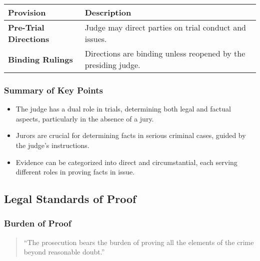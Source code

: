\begin{longtable}[]{@{}
  >{\raggedright\arraybackslash}p{}
  >{\raggedright\arraybackslash}p{}@{}}
\toprule\noalign{}
\begin{minipage}[b]{\linewidth}\raggedright
Provision
\end{minipage} & \begin{minipage}[b]{\linewidth}\raggedright
Description
\end{minipage} \\
\midrule\noalign{}
\endhead
\bottomrule\noalign{}
\endlastfoot
\textbf{Pre-Trial Directions} & Judge may direct parties on trial
conduct and issues. \\
\textbf{Binding Rulings} & Directions are binding unless reopened by the
presiding judge. \\
\end{longtable}

\subsubsection{Summary of Key Points}\label{summary-of-key-points}

\begin{itemize}
\tightlist
\item
  The judge has a dual role in trials, determining both legal and
  factual aspects, particularly in the absence of a jury.
\item
  Jurors are crucial for determining facts in serious criminal cases,
  guided by the judge's instructions.
\item
  Evidence can be categorized into direct and circumstantial, each
  serving different roles in proving facts in issue.
\end{itemize}

\subsection{Legal Standards of Proof}\label{legal-standards-of-proof}

\subsubsection{Burden of Proof}\label{burden-of-proof}

\begin{quote}
``The prosecution bears the burden of proving all the elements of the
crime beyond reasonable doubt.''
\end{quote}

